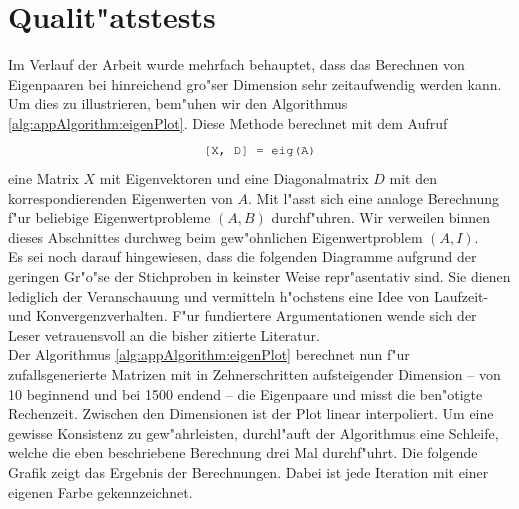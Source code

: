 \newpage
\section{Qualit"atstests}
Im Verlauf der Arbeit wurde mehrfach behauptet, dass das Berechnen von Eigenpaaren bei hinreichend gro"ser Dimension sehr zeitaufwendig werden kann. Um dies zu illustrieren, bem"uhen wir den Algorithmus \ref{alg:appAlgorithm:eigenPlot}. Diese Methode berechnet mit dem Aufruf
\[
\mcode{[X, D] = eig(A)}
\]
eine Matrix $X$ mit Eigenvektoren und eine Diagonalmatrix $D$ mit den korrespondierenden Eigenwerten von $A$. Mit  l"asst sich eine analoge Berechnung f"ur beliebige Eigenwertprobleme $(A,B)$ durchf"uhren. Wir verweilen binnen dieses Abschnittes durchweg beim gew"ohnlichen Eigenwertproblem $(A,I)$.\\

Es sei noch darauf hingewiesen, dass die folgenden Diagramme aufgrund der geringen Gr"o"se der Stichproben in keinster Weise repr"asentativ sind. Sie dienen lediglich der Veranschauung und vermitteln h"ochstens eine Idee von Laufzeit- und Konvergenzverhalten. F"ur fundiertere Argumentationen wende sich der Leser vetrauensvoll an die bisher zitierte Literatur.\\

Der Algorithmus \ref{alg:appAlgorithm:eigenPlot} berechnet nun f"ur zufallsgenerierte Matrizen mit in Zehnerschritten aufsteigender Dimension -- von 10 beginnend und bei 1500 endend -- die Eigenpaare und misst die ben"otigte Rechenzeit. Zwischen den Dimensionen ist der Plot linear interpoliert. Um eine gewisse Konsistenz zu gew"ahrleisten, durchl"auft der Algorithmus eine Schleife, welche die eben beschriebene Berechnung drei Mal durchf"uhrt. Die folgende Grafik zeigt das Ergebnis der Berechnungen. Dabei ist jede Iteration mit einer eigenen Farbe gekennzeichnet.

